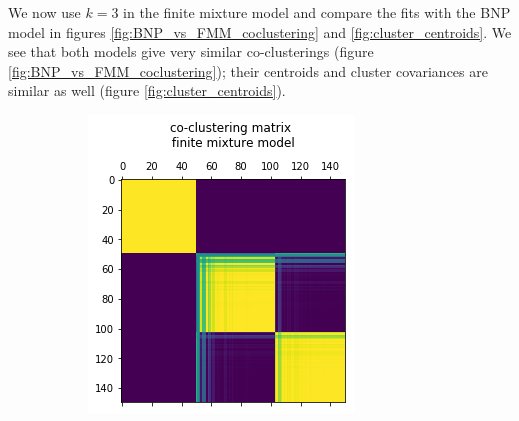 \documentclass[a4paper]{article}
\begin{document}
We now use $k = 3$ in the finite mixture model and compare the fits with the BNP model in figures
\ref{fig:BNP_vs_FMM_coclustering} and \ref{fig:cluster_centroids}. We see that
both models give very similar co-clusterings (figure \ref{fig:BNP_vs_FMM_coclustering});
their centroids and cluster covariances are similar as well (figure  \ref{fig:cluster_centroids}).

\begin{figure}[h!]
	\centering
  \begin{subfigure}[t]{0.3\textwidth}
		\includegraphics[width = \textwidth]{./finite_mixture_figures/finite_k3_coclust.png}
		\subcaption{}
	\end{subfigure}
  \begin{subfigure}[t]{0.3\textwidth}

\end{subfigure}
\end{figure}
\end{document}
